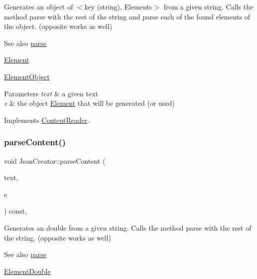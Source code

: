 Generates an object of $<$key (string), Elements$>$ from a given string. Calls the method parse with the rest of the string and parse each of the found elements of the object. (opposite works as well) \begin{DoxySeeAlso}{See also}
\mbox{\hyperlink{classJsonCreator_a505ff309c6b144d29478804b0e187c6f}{parse}} 

\mbox{\hyperlink{classElement}{Element}} 

\mbox{\hyperlink{classElementObject}{Element\+Object}}
\end{DoxySeeAlso}

\begin{DoxyParams}{Parameters}
{\em text} & a given text \\
\hline
{\em e} & the object \mbox{\hyperlink{classElement}{Element}} that will be generated (or used) \\
\hline
\end{DoxyParams}


Implements \mbox{\hyperlink{classContentReader_a59a8de2bf3436e46b4d029a9b3c3c9da}{Content\+Reader}}.

\mbox{\label{classJsonCreator_a5e841806165fd5cb595d9f7d7c924080}} 
\subsubsection{\texorpdfstring{parse\+Content()}{parseContent()}\hspace{0.1cm}{\footnotesize\ttfamily [6/6]}}
{\footnotesize\ttfamily void Json\+Creator\+::parse\+Content (\begin{DoxyParamCaption}\item[{std\+::string \&}]{text,  }\item[{\mbox{\hyperlink{classElementDouble}{Element\+Double}} $\ast$}]{e }\end{DoxyParamCaption}) const\hspace{0.3cm}{\ttfamily [override]}, {\ttfamily [virtual]}}

Generates an double from a given string. Calls the method parse with the rest of the string. (opposite works as well) \begin{DoxySeeAlso}{See also}
\mbox{\hyperlink{classJsonCreator_a505ff309c6b144d29478804b0e187c6f}{parse}} 

\mbox{\hyperlink{classElementDouble}{Element\+Double}}
\end{DoxySeeAlso}

